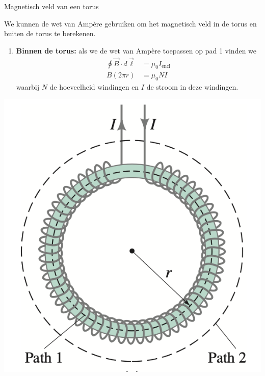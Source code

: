 \begin{app}{Magnetisch veld van een torus}
    \begin{minipage}{.73\textwidth}
        We kunnen de wet van Ampère gebruiken om het magnetisch veld in de torus en buiten de torus te berekenen.
        \begin{enumerate}
            \item \textbf{Binnen de torus:} als we de wet van Ampère toepassen op pad 1 vinden we 
            \begin{align*}
                \oint \Vec{B} \cdot d\Vec{\ell} &= \mu_{0}I_{\text{encl}} \\
                        B(2 \pi r) &= \mu_{0}NI
            \end{align*}
            waarbij $N$ de hoeveelheid windingen en $I$ de stroom in deze windingen.
        \end{enumerate}
    \end{minipage}
    \begin{minipage}{.23\textwidth}
        \vspace{-0.55cm}
        \includegraphics[scale = 0.4]{Images/Magnetisme/MagnetischVeldTorus.png}

\end{minipage}
\end{app}
